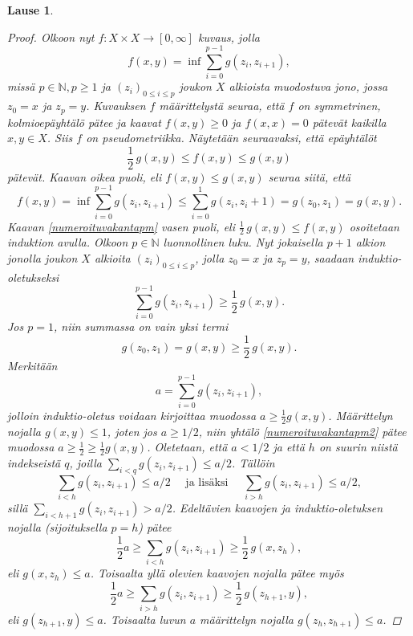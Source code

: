 \documentclass[12pt,a4paper,leqno]{report}
\newcommand{\N}{\mathbb{N}}
\theoremstyle{plain}
\newtheorem{lause}[equation]{Lause}
\theoremstyle{definition}
\theoremstyle{remark}
\begin{document}
\begin{lause}
\begin{proof}
Olkoon nyt $f\colon X\times X\rightarrow [0,\infty]$ kuvaus, 
jolla 
$$f(x,y)=\inf\sum_{i=0}^{p-1}g(z_i,z_{i+1}),$$
missä $p\in\N,p\geq 1$ ja $(z_i)_{0\leq i\leq p}$ 
joukon $X$ alkioista muodostuva jono, jossa $z_0=x$ ja $z_p=y$. 
Kuvauksen $f$ määrittelystä seuraa, 
että $f$ on symmetrinen, kolmioepäyhtälö pätee ja kaavat 
$f(x,y)\geq 0$ ja $f(x,x)=0$ pätevät kaikilla $x,y\in X$.
Siis $f$ on pseudometriikka. 
Näytetään seuraavaksi, että epäyhtälöt 
\begin{equation}\label{numeroituvakantapm}
\frac{1}{2}\,g(x,y)\leq f(x,y)\leq g(x,y)
\end{equation}
pätevät. 
Kaavan oikea puoli, eli $f(x,y)\leq g(x,y)$ seuraa siitä, 
että 
$$f(x,y)=\inf\sum_{i=0}^{p-1}g(z_i,z_{i+1})\leq\sum_{i=0}^1g(z_i,z_i+1)=g(z_0,z_1)=g(x,y).$$
Kaavan \ref{numeroituvakantapm} vasen puoli, 
eli $\frac{1}{2}\,g(x,y)\leq f(x,y)$ 
osoitetaan induktion avulla. 
Olkoon $p\in\N$ luonnollinen luku. 
Nyt jokaisella $p+1$ alkion jonolla joukon $X$ 
alkioita $ (z_i)_{0\leq i\leq p}$, 
jolla $z_0=x$ ja $z_p=y$, saadaan induktio-oletukseksi 
\begin{equation}\label{numeroituvakantapm2}
\sum_{i=0}^{p-1}g(z_i,z_{i+1})\geq \frac{1}{2}\,g(x,y).
\end{equation}
Jos $p=1$, niin summassa on vain yksi termi
$$g(z_0,z_{1})=g(x,y)\geq \frac{1}{2}\,g(x,y).$$
Merkitään 
\begin{equation}\label{numeroituvakantapm3}
a=\sum_{i=0}^{p-1}g(z_i,z_{i+1}),
\end{equation}
jolloin induktio-oletus voidaan kirjoittaa 
muodossa $a\geq \frac{1}{2}g(x,y) $. 
Määrittelyn nojalla $g(x,y)\leq 1$, joten jos $a\geq 1/2$, 
niin yhtälö \ref{numeroituvakantapm2} pätee muodossa 
$a\geq \frac{1}{2}\geq \frac{1}{2}g(x,y)$. 
Oletetaan, että $a<1/2$ ja että $h$ on suurin niistä indekseistä $q$, 
joilla $\sum_{i<q}g(z_i,z_{i+1})\leq a/2$. 
Tällöin 
\begin{equation*}\label{numeroituvakantapm4}
\sum_{i<h}g(z_i,z_{i+1})\leq a/2\quad\text{ ja lisäksi }\quad
\sum_{i>h}g(z_i,z_{i+1})\leq a/2,
\end{equation*}
sillä $\sum_{i<h+1}g(z_i,z_{i+1})> a/2$. 
Edeltävien kaavojen ja induktio-oletuksen nojalla 
(sijoituksella $p=h$) pätee
\begin{equation*}
\frac{1}{2}a\geq \sum_{i<h}g(z_i,z_{i+1})\geq \frac{1}{2}\,g(x,z_h),
\end{equation*}
eli $g(x,z_h)\leq a$. 
Toisaalta yllä olevien kaavojen nojalla pätee myös 
\begin{equation*}
\frac{1}{2}a\geq \sum_{i>h}g(z_i,z_{i+1})\geq \frac{1}{2}\,g(z_{h+1},y),
\end{equation*}
eli $g(z_{h+1},y)\leq a$. 
Toisaalta luvun $a$ 
määrittelyn nojalla 
$g(z_h,z_{h+1})\leq a$. 


\end{proof}
\end{lause}
\end{document}
